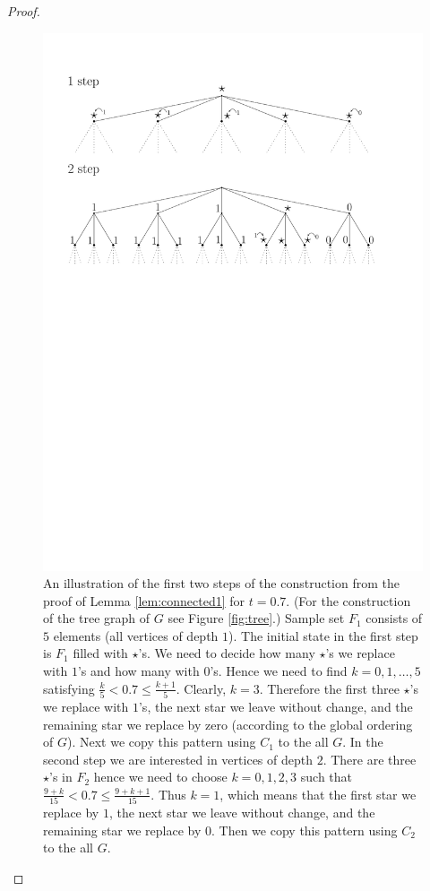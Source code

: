 \begin{proof}
\begin{figure}
\centering
\includegraphics[scale=0.85]{../Graphics/toeplitz_path_tree}
\caption{An illustration of the first two steps of the construction from the proof of Lemma \ref{lem:connected1} for $t=0.7$. (For the construction of the tree graph of $G$ see Figure \ref{fig:tree}.) Sample set $F_{1}$ consists of $5$ elements (all vertices of depth $1$). The initial state in the first step is $F_1$ filled with $\star$'s. We need to decide how many $\star$'s we replace with $1$'s and how many with $0$'s. Hence we need to find  $k=0,1,\ldots, 5$ satisfying $\frac{k}{5}< 0.7 \leq \frac{k+1}{5}$. Clearly, $k=3$. Therefore the first three $\star$'s we replace with $1$'s, the next star we leave without change, and  the remaining star we replace by zero (according to the global ordering of $G$). Next we copy this pattern using $C_1$  to the all $G$. In the second step we are interested in vertices of depth $2$. There are three $\star$'s in $F_{2}$ hence we need to choose $k=0,1,2,3$ such that $\frac{9+k}{15}< 0.7 \leq \frac{9+k+1}{15}$. Thus $k=1$, which means that the first star we replace by $1$, the next star we leave without change, and  the remaining star we replace by $0$. Then we copy this pattern using $C_2$ to the all $G$. }\label{fig:path_connect_Toeplitz}
\end{figure}




\end{proof}

